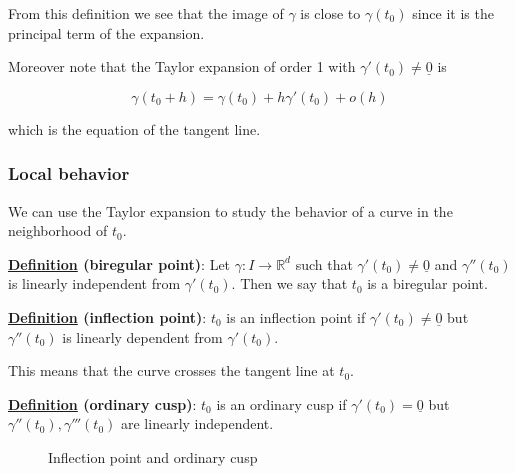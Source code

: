 \documentclass[10pt]{extarticle}
\newcommand{\R}{\mathbb{R}}
\begin{document}
From this definition we see that the image of $\gamma$ is close to $\gamma (t_0)$ since it is the principal term of the expansion.

Moreover note that the Taylor expansion of order 1 with $\gamma'(t_0) \ne \underline 0$ is

$$
    \gamma(t_0 + h) = \gamma(t_0) + h \gamma'(t_0) + o(h)
$$

which is the equation of the tangent line.

\subsubsection{Local behavior}

We can use the Taylor expansion to study the behavior of a curve in the neighborhood of $t_0$.


\textbf{\underline{Definition} (biregular point)}:
Let $\gamma: I \to \R^d$ such that $\gamma'(t_0) \ne \underline 0$ and $\gamma''(t_0)$ is linearly independent from $\gamma'(t_0)$.
Then we say that $t_0$ is a biregular point.

\textbf{\underline{Definition} (inflection point)}:
$t_0$ is an inflection point if $\gamma'(t_0) \ne \underline 0$ but $\gamma''(t_0)$ is linearly dependent from $\gamma'(t_0)$.

This means that the curve crosses the tangent line at $t_0$.


\textbf{\underline{Definition} (ordinary cusp)}:
$t_0$ is an ordinary cusp if $\gamma'(t_0) = \underline 0$ but $\gamma''(t_0), \gamma'''(t_0)$ are linearly independent.

\begin{figure}
    \centering
    \caption{Inflection point and ordinary cusp}
    \label{fig:inflection_point_and_ordinary_cusp}
\end{figure}
\end{document}

